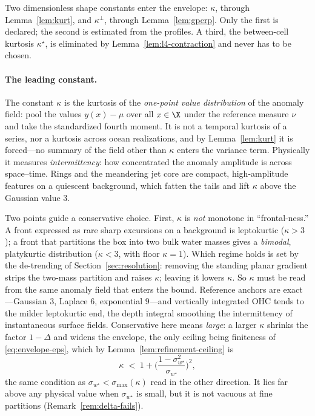 \begin{remark}
\label{rem:kappa}
Two dimensionless shape constants enter the envelope: $\kappa$, through
Lemma~\ref{lem:kurt}, and $\kappa^{\perp}$, through
Lemma~\ref{lem:gperp}. Only the first is declared; the second is
estimated from the profiles. A third, the between-cell kurtosis
$\kappa^{\star}$, is eliminated by Lemma~\ref{lem:l4-contraction} and
never has to be chosen.

\paragraph*{The leading constant.}
The constant $\kappa$ is the kurtosis of the \emph{one-point value
distribution} of the anomaly field: pool the values $y(x)-\mu$ over all
$x\in\X$ under the reference measure $\nu$ and take the standardized
fourth moment. It is not a temporal kurtosis of a series, nor a kurtosis
across ocean realizations, and by Lemma~\ref{lem:kurt} it is
forced---no summary of the field other than $\kappa$ enters the variance
term. Physically it measures \emph{intermittency}: how concentrated the
anomaly amplitude is across space--time. Rings and the meandering jet
core are compact, high-amplitude features on a quiescent background,
which fatten the tails and lift $\kappa$ above the Gaussian value $3$.

Two points guide a conservative choice. First, $\kappa$ is \emph{not}
monotone in ``frontal-ness.'' A front expressed as rare sharp excursions
on a background is leptokurtic ($\kappa>3$); a front that partitions the
box into two bulk water masses gives a \emph{bimodal}, platykurtic
distribution ($\kappa<3$, with floor $\kappa=1$). Which regime holds is
set by the de-trending of Section~\ref{sec:resolution}: removing the
standing planar gradient strips the two-mass partition and raises
$\kappa$; leaving it lowers $\kappa$. So $\kappa$ must be read from the
same anomaly field that enters the bound. Reference anchors are
exact---Gaussian $3$, Laplace $6$, exponential $9$---and vertically
integrated OHC tends to the milder leptokurtic end, the depth integral
smoothing the intermittency of instantaneous surface fields.
Conservative here means \emph{large}: a larger $\kappa$ shrinks the
factor $1-\Delta$ and widens the envelope, the only ceiling being
finiteness of \eqref{eq:envelope-eps}, which by
Lemma~\ref{lem:refinement-ceiling} is
\[
  \kappa\;<\;1+\Big(\frac{1-\sigma_{w^{\star}}^2}{\sigma_{w^{\star}}}\Big)^{2},
\]
the same condition as $\sigma_{w^{\star}}<\sigma_{\max}(\kappa)$ read in
the other direction. It lies far above any physical value when
$\sigma_{w^{\star}}$ is small, but it is not vacuous at fine partitions
(Remark~\ref{rem:delta-fails}).


\end{remark}
